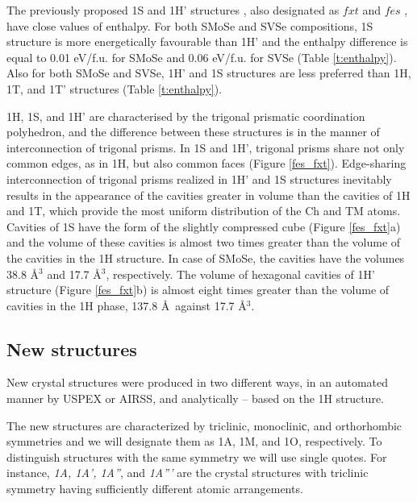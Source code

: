 \documentclass[a4paperm]{article}
\begin{document}
The previously proposed 1S and 1H' structures \cite{tang2021_janus,ma2016_fxt}, also designated as $fxt$ and $fes$ \cite{PhysRevB.93.035442, Terrones_2014,PhysRevB.92.085427},  have close values of enthalpy.
For both SMoSe and SVSe compositions, 1S structure is more energetically favourable than 1H' and the enthalpy difference is equal to 0.01 eV/f.u. for SMoSe and 0.06 eV/f.u. for SVSe (Table \ref{t:enthalpy}).
Also for both SMoSe and SVSe, 1H' and 1S structures are less preferred than 1H, 1T, and 1T' structures (Table \ref{t:enthalpy}).

1H, 1S, and 1H' are characterised by the trigonal prismatic coordination polyhedron, and the difference between these structures is in the manner of interconnection of trigonal prisms. 
In 1S and 1H', trigonal prisms share not only common edges, as in 1H, but also common faces (Figure \ref{fes_fxt}).
Edge-sharing interconnection of trigonal prisms realized in 1H' and 1S structures inevitably results in the appearance of the cavities greater in volume than the cavities of 1H and 1T, which provide the most uniform distribution of the Ch and TM atoms. 
Cavities of 1S have the form of the slightly compressed cube (Figure \ref{fes_fxt}a) and the volume of these cavities is almost two times greater than the volume of the cavities in the 1H structure.
In case of SMoSe, the cavities have the volumes 38.8 \AA$^3$ and 17.7 \AA$^3$, respectively.
The volume of hexagonal cavities of 1H' structure (Figure \ref{fes_fxt}b) is almost eight times greater than the volume of cavities in the 1H phase, 137.8 \AA\ against 17.7 \AA$^3$.




		\subsection{New structures}

New crystal structures were produced in two different ways, in an automated manner by USPEX or AIRSS, and analytically -- based on the 1H structure.


The new structures are characterized by triclinic, monocliniс, and orthorhombic symmetries and we will designate them as 1A, 1M, and 1O, respectively.
To distinguish structures with the same symmetry we will use single quotes.
For instance, {\it 1A, 1A', 1A''}, and {\it 1A'''} are the crystal structures with triclinic symmetry having sufficiently different atomic arrangements.
\end{document}
